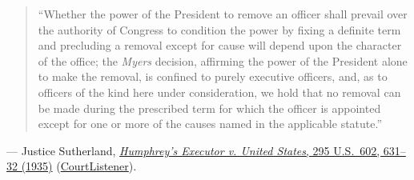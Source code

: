 \documentclass[12pt]{article}
\begin{document}
\begin{quote}
``Whether the power of the President to remove an officer shall prevail over the authority of Congress to condition the power by fixing a definite term and precluding a removal except for cause will depend upon the character of the office; the \textit{Myers} decision, affirming the power of the President alone to make the removal, is confined to purely executive officers, and, as to officers of the kind here under consideration, we hold that no removal can be made during the prescribed term for which the officer is appointed except for one or more of the causes named in the applicable statute.''
\end{quote}
\noindent --- Justice Sutherland, \href{https://supreme.justia.com/cases/federal/us/295/602/}{\textit{Humphrey's Executor v. United States}, 295 U.S.\ 602, 631--32 (1935)} (\href{https://www.courtlistener.com/opinion/102475/humphreys-v-united-states/}{CourtListener}).
\end{document}
